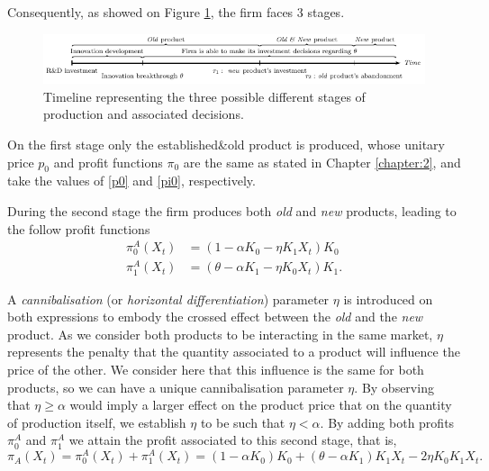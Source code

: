 Consequently, as showed on Figure \ref{3_time}, the firm faces 3 stages.

\vspace{4mm}
\begin{figure}[!htb]
	\centering
	\includegraphics[width=\textwidth]{Prob3/3_timelinet.PNG}
	\caption{Timeline representing the three possible different stages of production and associated decisions.}
	\label{3_time}
\end{figure}
On the first stage only the established\&old product is produced, whose unitary price $p_0$ and profit functions $\pi_0$ are the same as stated in Chapter \ref{chapter:2}, and take the values of \eqref{p0} and \eqref{pi0}, respectively.

During the second stage the firm produces both \textit{old} and \textit{new} products, leading to the follow profit functions
\begin{align}
\pi_0^A(X_t)&=(1-\alpha K_0-\eta K_1 X_t) K_0\\
\pi_1^A(X_t)&=(\theta-\alpha K_1-\eta K_0 X_t) K_1.
\end{align}

A \textit{cannibalisation} (or\textit{ horizontal differentiation}) parameter $\eta$ is introduced on both expressions to embody the crossed effect between the \textit{old} and the \textit{new} product. As we consider both products to be interacting in the same market, $\eta$ represents the penalty that the quantity
associated to a product will influence the price of the other. We consider here
that this influence is the same for both products, so we can have a unique cannibalisation parameter $\eta$.
By observing that $\eta\geq \alpha$ would imply a larger effect on the product price that on the quantity of production itself, we establish $\eta$ to be such that $\eta < \alpha$. 
By adding both profits $\pi^A_0$ and $\pi_1^A$ we attain the profit associated to this second stage, that is,
\begin{equation}
\pi_A(X_t)=\pi_0^A(X_t)+\pi_1^A(X_t)=(1-\alpha K_0)K_0+(\theta-\alpha K_1)K_1X_t-2\eta K_0 K_1 X_t.
\end{equation}

